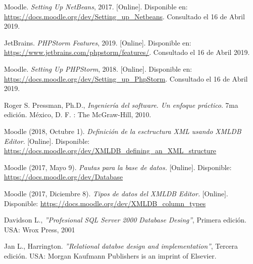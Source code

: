 \begin{thebibliography}{9}
        Moodle. {\it Setting Up NetBeans}, 2017. [Online]. Disponible en: \url{https://docs.moodle.org/dev/Setting_up_Netbeans}. Consultado el 16 de Abril 2019.
    
        JetBrains. {\it PHPStorm Features}, 2019. [Online]. Disponible en: \url{https://www.jetbrains.com/phpstorm/features/}. Consultado el 16 de Abril 2019.
    
        Moodle. {\it Setting Up PHPStorm}, 2018. [Online]. Disponible en: \url{https://docs.moodle.org/dev/Setting_up_PhpStorm}. Consultado el 16 de Abril 2019.
    
        Roger S. Pressman, Ph.D., \textit{Ingeniería del software. Un enfoque práctico}. 7ma edición. México, D. F. : The McGraw-Hill, 2010. 
    
         Moodle  (2018, Octubre 1).\textit{ Definición de la esctructura XML usando XMLDB Editor}.  [Online]. Disponible: \url{ https://docs.moodle.org/dev/XMLDB_defining_an_XML_structure}   
     
     
          Moodle (2017, Mayo 9). \textit{Pautas para la base de datos.} [Online]. Disponible: \url{https://docs.moodle.org/dev/Database}
    
        Moodle  (2017, Diciembre 8). \textit{Tipos de datos del XMLDB Editor.} [Online]. Disponible: \url{https://docs.moodle.org/dev/XMLDB_column_types}
  
        Davidson L., \textit{''Profesional SQL Server 2000 Database Desing''}, Primera edición. USA: Wrox Press, 2001
  
        Jan L., Harrington. \textit{''Relational databse design and implementation''}, Tercera edición. USA: Morgan Kaufmann Publishers is an imprint of Elsevier. 
   

\end{thebibliography}
